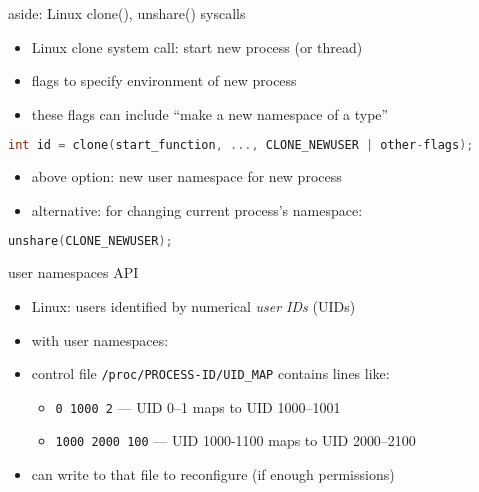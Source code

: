 \begin{frame}[fragile,label=LinuxCloneUnshare]{aside: Linux clone(), unshare() syscalls}
\begin{itemize}
\item Linux clone system call: start new process (or thread)
\item flags to specify environment of new process
\item these flags can include ``make a new namespace of a type''
\end{itemize}
\begin{lstlisting}[style=smaller,language=C++]
int id = clone(start_function, ..., CLONE_NEWUSER | other-flags);
\end{lstlisting}
\begin{itemize}
\item above option: new user namespace for new process
\vspace{.5cm}
\item alternative: for changing current process's namespace:
\end{itemize}
\begin{lstlisting}[style=smaller,language=C++]
unshare(CLONE_NEWUSER);
\end{lstlisting}
\end{frame}

\begin{frame}{user namespaces API}
\begin{itemize}
\item Linux: users identified by numerical \textit{user IDs} (UIDs)
\vspace{.5cm}
\item with user namespaces:
\item control file \texttt{/proc/PROCESS-ID/UID\_MAP} contains lines like:
    \begin{itemize}
    \item \texttt{0 1000 2} --- UID 0--1 maps to UID 1000--1001
    \item \texttt{1000 2000 100} --- UID 1000-1100 maps to UID 2000--2100
    \end{itemize}
\item can write to that file to reconfigure (if enough permissions)
\end{itemize}
\end{frame}

